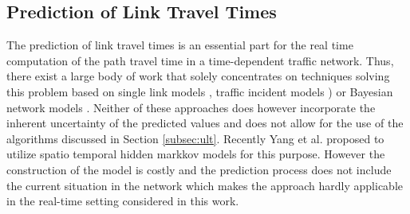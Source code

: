 


\subsection{Prediction of Link Travel Times}
The prediction of link travel times is an essential part for the real time computation of the path travel time in a time-dependent traffic network. Thus, there exist a large body of work that solely concentrates on techniques solving this problem based on single link models \cite{Pan12}, traffic incident models \cite{Pan13}) or Bayesian network models \cite{Sun06}. Neither of these approaches does however incorporate the inherent uncertainty of the predicted values and does not allow for the use of the algorithms discussed in Section \ref{subsec:ult}. Recently Yang et al.\cite{Yang13} proposed to utilize spatio temporal hidden markkov models for this purpose. However the construction of the model is costly and the prediction process does not include the current situation in the network which makes the approach hardly applicable in the real-time setting considered in this work.